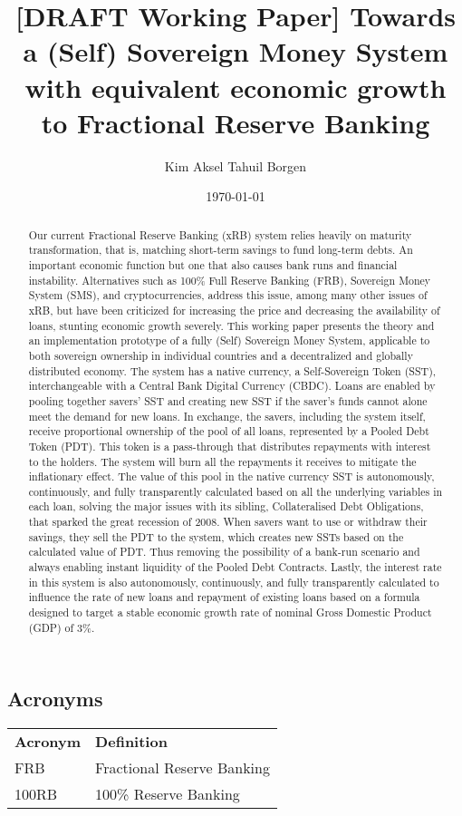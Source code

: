 \documentclass{article}
\title{[DRAFT Working Paper] Towards a (Self) Sovereign Money System with equivalent economic growth to Fractional Reserve Banking}
\author{Kim Aksel Tahuil Borgen}
\date{\today}
\begin{document}
\maketitle
\begin{abstract}
    Our current Fractional Reserve Banking (xRB) system relies heavily on maturity transformation, that is, matching short-term savings to fund long-term debts. An important economic function but one that also causes bank runs and financial instability. Alternatives such as 100\% Full Reserve Banking (FRB), Sovereign Money System (SMS), and cryptocurrencies, address this issue, among many other issues of xRB, but have been criticized for increasing the price and decreasing the availability of loans, stunting economic growth severely. This working paper presents the theory and an implementation prototype of a fully (Self) Sovereign Money System, applicable to both sovereign ownership in individual countries and a decentralized and globally distributed economy. The system has a native currency, a Self-Sovereign Token (SST), interchangeable with a Central Bank Digital Currency (CBDC). Loans are enabled by pooling together savers' SST and creating new SST if the saver's funds cannot alone meet the demand for new loans. In exchange, the savers, including the system itself, receive proportional ownership of the pool of all loans, represented by a Pooled Debt Token (PDT). This token is a pass-through that distributes repayments with interest to the holders. The system will burn all the repayments it receives to mitigate the inflationary effect. The value of this pool in the native currency SST is autonomously, continuously, and fully transparently calculated based on all the underlying variables in each loan, solving the major issues with its sibling, Collateralised Debt Obligations, that sparked the great recession of 2008. When savers want to use or withdraw their savings, they sell the PDT to the system, which creates new SSTs based on the calculated value of PDT. Thus removing the possibility of a bank-run scenario and always enabling instant liquidity of the Pooled Debt Contracts. Lastly, the interest rate in this system is also autonomously, continuously, and fully transparently calculated to influence the rate of new loans and repayment of existing loans based on a formula designed to target a stable economic growth rate of nominal Gross Domestic Product (GDP) of 3\%.  
\end{abstract}

\subsection{Acronyms}

\begin{tabular}{ll}
\textbf{Acronym} & \textbf{Definition} \\
FRB & Fractional Reserve Banking \\
100RB & 100\% Reserve Banking \\
\end{tabular}





\printbibliography
\end{document}

